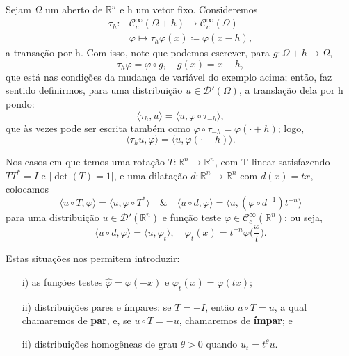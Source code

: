 \documentclass[../distribution_theory_notes.tex]{subfiles}
\begin{document}
\begin{example}
  Sejam \(\Omega \) um aberto de \(\mathbb{R}^{n}\) e h um vetor fixo. Consideremos 
 \begin{align*}
     \tau_h:&\mathcal{C}_{c}^{\infty}(\Omega +h)\rightarrow \mathcal{C}_{c}^{\infty}(\Omega ) \\
        &\varphi \longmapsto \tau_h\varphi (x)\coloneqq \varphi (x-h),
 \end{align*}
 a transação por h. Com isso, note que podemos escrever, para \(g:\Omega +h\rightarrow \Omega \),
   \[
     \tau_h\varphi = \varphi \circ g, \quad g(x)=x-h,
   \]
   que está nas condições da mudança de variável do exemplo acima; então, faz sentido definirmos, para uma distribuição \(u\in \mathcal{D}'(\Omega )\), a translação dela por h pondo: 
     \[
       \langle \tau_h, u \rangle = \langle u, \varphi \circ \tau_{-h} \rangle,
     \]
     que às vezes pode ser escrita também como \(\varphi \circ \tau_{-h}=\varphi (\cdot +h)\); logo, 
       \[
         \langle \tau_hu, \varphi  \rangle = \langle u, \varphi (\cdot +h) \rangle.
       \]

      Nos casos em que temos uma rotação \(T:\mathbb{R}^{n}\rightarrow \mathbb{R}^{n}\), com T linear satisfazendo \(TT^{*}= I\) e \(| \det{(T)} = 1 |\), e uma dilatação \(d:\mathbb{R}^{n}\rightarrow \mathbb{R}^{n}\) com \(d(x)=tx\), colocamos 
        \[
          \langle u \circ T, \varphi  \rangle= \langle u, \varphi \circ T^{*} \rangle \quad\&\quad \langle u\circ d, \varphi  \rangle = \langle u, (\varphi \circ d^{-1})t^{-n} \rangle
        \]
        para uma distribuição \(u\in \mathcal{D}'(\mathbb{R}^{n})\) e função teste \(\varphi \in \mathcal{C}_{c}^{\infty}(\mathbb{R}^{n})\); ou seja, 
          \[
            \langle u\circ d, \varphi  \rangle = \langle u, \varphi_{t} \rangle,\quad \varphi_{t}(x)=t^{-n}\varphi \biggl(\frac{x}{t}\biggr).
          \]

          Estas situações nos permitem introduzir: 
         \begin{itemize}
           \item[i)] as funções testes \(\hat{\varphi }=\varphi (-x)\) e \(\varphi_{t}(x)=\varphi (tx)\);
             \item[ii)] distribuições pares e ímpares: se \(T=-I\), então \(u\circ T = u\), a qual chamaremos de \textbf{par}, e, se \(u\circ T=-u\), chamaremos de \textbf{ímpar}; e 
               \item[ii)] distribuições homogêneas de grau \(\theta >0\) quando \(u_{t}=t^{\theta }u.\)
         \end{itemize}

\end{example}
\end{document}
